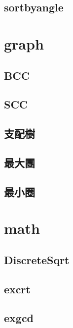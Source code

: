 \documentclass[a4paper,10pt,twocolumn,oneside]{article}
\begin{document}
    \subsection{sortbyangle}
    

\section{graph}
    \subsection{BCC}
    

    \subsection{SCC}
    

    \subsection{支配樹}
    

    \subsection{最大團}
    

    \subsection{最小圈}
    

\section{math}
    \subsection{DiscreteSqrt}
    

    \subsection{excrt}
    

    \subsection{exgcd}
    
\end{document}
